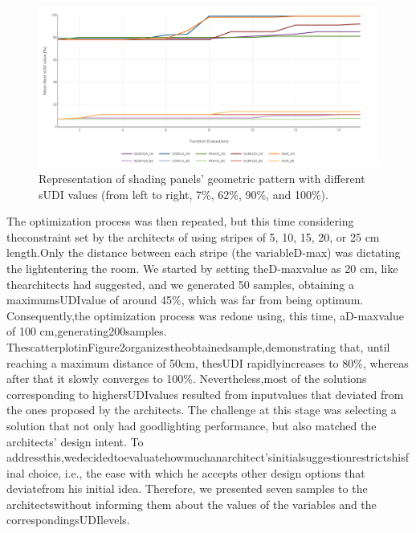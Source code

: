 \begin{figure}[htbp]
	\centering
	\includegraphics[width=\textwidth]{Images/Evaluation/Ericeira_results_ph2.PNG}
	\caption{Representation of shading panels’ geometric pattern with different sUDI values (from left to right, 7\%, 62\%, 90\%, and 100\%).}
	\label{fig:ericeira_multiple_panels}
\end{figure}



The optimization process was then repeated, but this time considering theconstraint set by the architects of using stripes of 5, 10, 15, 20, or 25 cm length.Only the distance between each stripe (the variableD-max) was dictating the lightentering the room. We started by setting theD-maxvalue as 20 cm, like thearchitects had suggested, and we generated 50 samples, obtaining a maximumsUDIvalue of around 45\%, which was far from being optimum. Consequently,the optimization process was redone using, this time, aD-maxvalue of 100 cm,generating200samples. ThescatterplotinFigure2organizestheobtainedsample,demonstrating that, until reaching a maximum distance of 50cm, thesUDI rapidlyincreases to 80\%, whereas after that it slowly converges to 100\%. Nevertheless,most of the solutions corresponding to highersUDIvalues resulted from inputvalues that deviated from the ones proposed by the architects. 
The challenge at this stage was selecting a solution that not only had goodlighting performance, but also matched the architects’ design intent. To addressthis,wedecidedtoevaluatehowmuchanarchitect’sinitialsuggestionrestrictshisfinal choice, i.e., the ease with which he accepts other design options that deviatefrom his initial idea. Therefore, we presented seven samples to the architectswithout informing them about the values of the variables and the correspondingsUDIlevels. 

